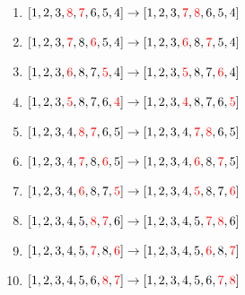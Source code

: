 \documentclass[final]{article}
\begin{document}
\begin{solution}
\begin{enumerate}[nosep]
        \item $[1,2,3,{\color{red}8},{\color{red}7},6,5,4]\rightarrow [1,2,3,{\color{red}7},{\color{red}8},6,5,4]$
        \item $[1,2,3,{\color{red}7},8,{\color{red}6},5,4]\rightarrow [1,2,3,{\color{red}6},8,{\color{red}7},5,4]$
        \item $[1,2,3,{\color{red}6},8,7,{\color{red}5},4]\rightarrow [1,2,3,{\color{red}5},8,7,{\color{red}6},4]$
        \item $[1,2,3,{\color{red}5},8,7,6,{\color{red}4}]\rightarrow [1,2,3,{\color{red}4},8,7,6,{\color{red}5}]$
        \item $[1,2,3,4,{\color{red}8},{\color{red}7},6,5]\rightarrow [1,2,3,4,{\color{red}7},{\color{red}8},6,5]$
        \item $[1,2,3,4,{\color{red}7},8,{\color{red}6},5]\rightarrow [1,2,3,4,{\color{red}6},8,{\color{red}7},5]$
        \item $[1,2,3,4,{\color{red}6},8,7,{\color{red}5}]\rightarrow [1,2,3,4,{\color{red}5},8,7,{\color{red}6}]$
        \item $[1,2,3,4,5,{\color{red}8},{\color{red}7},6]\rightarrow [1,2,3,4,5,{\color{red}7},{\color{red}8},6]$
        \item $[1,2,3,4,5,{\color{red}7},8,{\color{red}6}]\rightarrow [1,2,3,4,5,{\color{red}6},8,{\color{red}7}]$
        \item $[1,2,3,4,5,6,{\color{red}8},{\color{red}7}]\rightarrow [1,2,3,4,5,6,{\color{red}7},{\color{red}8}]$
    \end{enumerate}


\end{solution}
\end{document}
